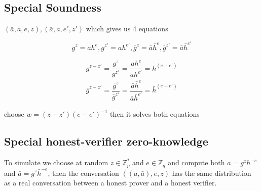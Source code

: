 \documentclass[paper=a4, fontsize=11pt]{scrartcl} %
\numberwithin{equation}{section} %
\numberwithin{figure}{section} %
\numberwithin{table}{section} %
\begin{document}
	\subsection*{Special Soundness}
	
	 $(\bar{a},a,e,z),(\bar{a},a,e',z')$ which gives us 4 equations
	 
	 $$g^z=ah^e, g^{z'}=ah^{e'}, \bar{g}^z=\bar{a}\bar{h}^e, \bar{g}^{z'}=\bar{a}\bar{h}^{e'}$$
	 
	 \begin{align*}
	 g^{z-z'}=\dfrac{g^z}{g^{z'}}=\dfrac{ah^e}{ah^{e'}}= h^(e-e')\\
	 \bar{g}^{z-z'}=\dfrac{\bar{g}^z}{\bar{g}^{z'}}=\dfrac{\bar{a}\bar{h}^e}{\bar{a}\bar{h}^{e'}}=\bar{h}^(e-e')
	 \end{align*}
	 
	 choose $w=(z-z')(e-e')^{-1}$ then it solves both equations
	
	\subsection*{Special honest-verifier zero-knowledge}
	
	To simulate we choose at random $z\in\mathbb{Z}_p^*$ and $e\in\mathbb{Z}_q$ and compute both $a=g^zh^{-e}$ and $\bar{a}=\bar{g}^z\bar{h}^{-e}$, then the conversation $((a,\bar{a}),e,z)$ has the same distribution as a real conversation between a honest prover and a honest verifier.
\end{document}
